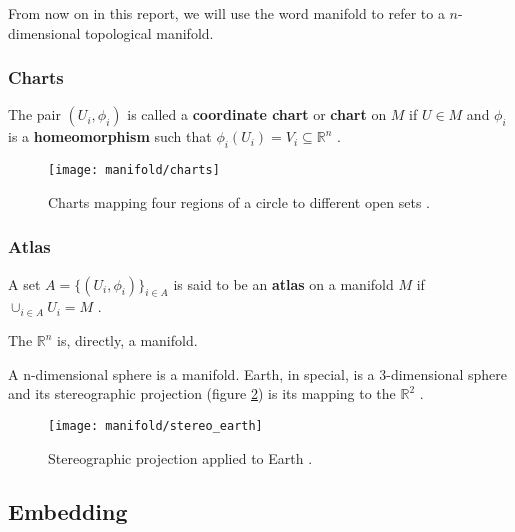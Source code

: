 From now on in this report, we will use the word manifold to refer to a $n$-dimensional topological manifold.

\subsubsection{Charts}
The pair $(U_i, \phi_i)$ is called a \textbf{coordinate chart} or \textbf{chart} on $M$ if $U \in M$ and $\phi_i$ is a \textbf{homeomorphism} such that $\phi_i(U_i) = V_i \subseteq \mathbb{R}^n$ \cite{lee2002}.

\begin{figure}[H]
	\centering
	\captionsetup{justification=centering}
	
	\texttt{[image: manifold/charts]}
	\caption{Charts mapping four regions of a circle to different open sets \protect\footnotemark.}
	\label{fig:mani_charts}
\end{figure}


\subsubsection{Atlas}
A set $A = \{(U_i, \phi_i)\}_{i \in A}$ is said to be an \textbf{atlas} on a manifold $M$ if $\cup_{i \in A} U_i = M$ \cite{lee2002}.

\begin{example}
	The $\mathbb{R}^n$ is, directly, a manifold.
\end{example}

\begin{example}
	A n-dimensional sphere is a manifold. Earth, in special, is a 3-dimensional sphere and its stereographic projection (figure \ref{fig:stereographic_earth}) is its mapping to the $\mathbb{R}^2$ \cite{stereo_proj}.

	\begin{figure}[H]
		\centering
		\captionsetup{justification=centering}

		\texttt{[image: manifold/stereo\_earth]}
		\caption{Stereographic projection applied to Earth \cite{stereo_proj}.}
		\label{fig:stereographic_earth}
	\end{figure}
\end{example}

\subsection{Embedding}

